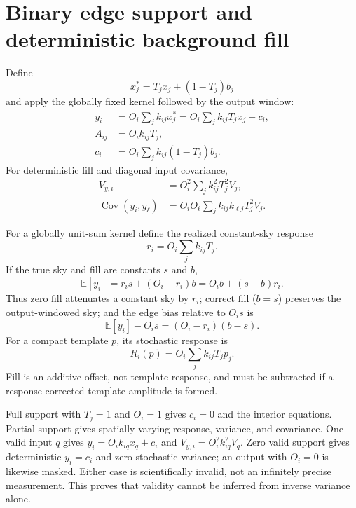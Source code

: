 \documentclass[11pt]{article}
\newcommand{\E}{\mathbb{E}}
\newcommand{\Cov}{\operatorname{Cov}}
\begin{document}
\section{Binary edge support and deterministic background fill}
\label{sec:edges}

Define
\begin{equation}
 x_j^*=T_jx_j+(1-T_j)b_j
 \label{eq:edge-input}
\end{equation}
and apply the globally fixed kernel followed by the output window:
\begin{align}
 y_i&=O_i\sum_jk_{ij}x_j^*
     =O_i\sum_j k_{ij}T_jx_j+c_i,
 \label{eq:edge-stored}\\
 A_{ij}&=O_i k_{ij}T_j,
 \label{eq:edge-A}\\
 c_i&=O_i\sum_jk_{ij}(1-T_j)b_j.
 \label{eq:edge-c}
\end{align}
For deterministic fill and diagonal input covariance,
\begin{align}
 V_{y,i}&=O_i^2\sum_jk_{ij}^2T_j^2V_j,
 \label{eq:edge-var}\\
 \Cov(y_i,y_\ell)&=O_iO_\ell
     \sum_jk_{ij}k_{\ell j}T_j^2V_j.
 \label{eq:edge-cov}
\end{align}

For a globally unit-sum kernel define the realized constant-sky response
\begin{equation}
 r_i=O_i\sum_jk_{ij}T_j.
 \label{eq:edge-response}
\end{equation}
If the true sky and fill are constants $s$ and $b$,
\begin{equation}
 \E[y_i]=r_i s+(O_i-r_i)b
         =O_i b+(s-b)r_i.
 \label{eq:constant-edge-mean}
\end{equation}
Thus zero fill attenuates a constant sky by $r_i$; correct fill ($b=s$)
preserves the output-windowed sky; and the edge bias relative to $O_i s$ is
\begin{equation}
 \E[y_i]-O_i s=(O_i-r_i)(b-s).
 \label{eq:edge-bias}
\end{equation}
For a compact template $p$, its stochastic response is
\begin{equation}
 R_i(p)=O_i\sum_jk_{ij}T_jp_j.
 \label{eq:edge-template-response}
\end{equation}
Fill is an additive offset, not template response, and must be subtracted if a
response-corrected template amplitude is formed.

Full support with $T_j=1$ and $O_i=1$ gives $c_i=0$ and the interior
equations.  Partial support gives spatially varying response, variance, and
covariance.  One valid input $q$ gives $y_i=O_i k_{iq}x_q+c_i$ and
$V_{y,i}=O_i^2k_{iq}^2V_q$.  Zero valid support gives deterministic
$y_i=c_i$ and zero stochastic variance; an output with $O_i=0$ is likewise
masked.  Either case is scientifically invalid, not an infinitely precise
measurement.  This proves that validity cannot be inferred from inverse
variance alone.
\end{document}
